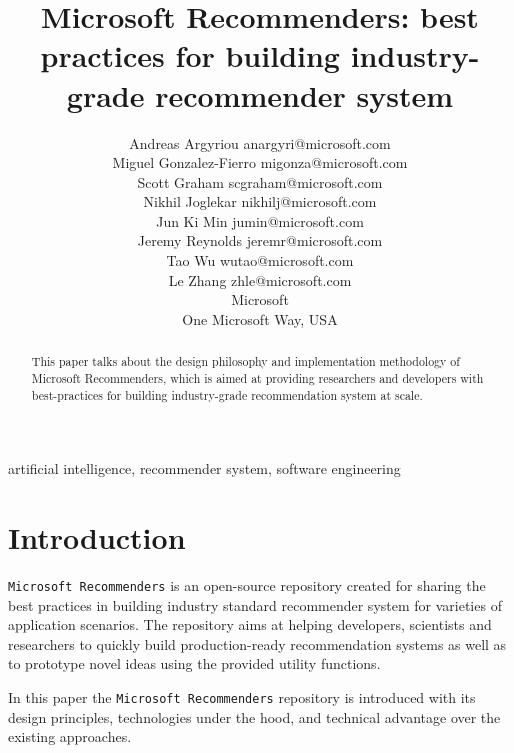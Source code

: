 \documentclass[twoside,11pt]{article}
\begin{document}
\title{Microsoft Recommenders: best practices for building industry-grade recommender system}

\author{\name Andreas Argyriou \email anargyri@microsoft.com \\
  \name Miguel Gonzalez-Fierro \email migonza@microsoft.com \\
  \name Scott Graham \email scgraham@microsoft.com \\
  \name Nikhil Joglekar \email nikhilj@microsoft.com \\
  \name Jun Ki Min \email jumin@microsoft.com \\
  \name Jeremy Reynolds \email jeremr@microsoft.com \\
  \name Tao Wu \email wutao@microsoft.com \\
  \name Le Zhang \email zhle@microsoft.com \\
  \addr Microsoft \\
  One Microsoft Way, USA
}


\maketitle

\begin{abstract}%
  This paper talks about the design philosophy and implementation methodology of Microsoft Recommenders, which is aimed at providing researchers and developers with best-practices for building  industry-grade recommendation system at scale.
\end{abstract}

\begin{keywords}
  artificial intelligence, recommender system, software engineering
\end{keywords}

\section{Introduction}
\verb|Microsoft Recommenders| is an open-source repository created for sharing the best practices in building industry standard recommender system for varieties of application scenarios. The repository aims at helping developers, scientists and researchers to quickly build production-ready recommendation systems as well as to prototype novel ideas using the provided utility functions.

In this paper the \verb|Microsoft Recommenders| repository is introduced with its design principles, technologies under the hood, and technical advantage over the existing approaches.
\end{document}
